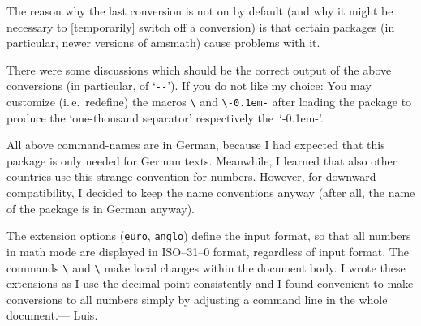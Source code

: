 \documentclass[DIV=8, parskip=half, pagesize=auto]{scrartcl}
\makeatletter
\newcommand*{\pkg}[1]{\textsf{#1}}
\newcommand*{\cs}[1]{\texttt{\textbackslash#1}}
\newcommand*{\cmd}[1]{\cs{\expandafter\@gobble\string#1}}
\newcommand*{\opt}[1]{\texttt{#1}}
\newcommand*{\ZifferStrich}{\mbox{\textrm{-\kern0.1em-}}}
\makeatother
\begin{document}
The reason why the last conversion is not on by default (and why it might be
necessary to [temporarily] switch off a conversion) is that certain packages
(in particular, newer versions of \pkg{amsmath}) cause problems with it.

There were some discussions which should be the correct output of the
above conversions (in particular, of `\verb+--+').
If you do not like my choice: You may customize (i.\,e.\ redefine) the macros
\cmd{\ZifferLeer} and \cmd{\ZifferStrich}
after loading the package to produce the `one-thousand separator'
respectively the~`\ZifferStrich'.

All above command-names are in German, because I had expected that this
package is only needed for German texts. Meanwhile, I learned that also
other countries use this strange convention for numbers. However, for
downward compatibility, I decided to keep the name conventions anyway
(after all, the name of the package is in German anyway).

\medskip

The extension options (\opt{euro}, \opt{anglo}) define the input format, so that all numbers
in math mode are displayed in ISO--31--0 format, regardless of input format.
The commands \cmd{\EuroZiffer} and \cmd{\AngloZiffer} make local changes within the document body.
I wrote these extensions as I use the decimal point consistently and I found 
convenient to make conversions to all numbers simply by adjusting a command line 
in the whole document.--- Luis.
\end{document}
